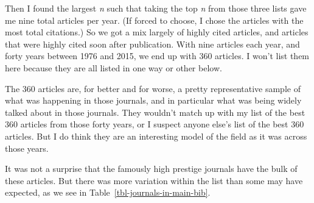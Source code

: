 \documentclass[
  10pt,
  letterpaper,
  DIV=11,
  numbers=noendperiod,
  twoside]{scrartcl}
\begin{document}
Then I found the largest \emph{n} such that taking the top \emph{n} from
those three lists gave me nine total articles per year. (If forced to
choose, I chose the articles with the most total citations.) So we got a
mix largely of highly cited articles, and articles that were highly
cited soon after publication. With nine articles each year, and forty
years between 1976 and 2015, we end up with 360 articles. I won't list
them here because they are all listed in one way or other below.

The 360 articles are, for better and for worse, a pretty representative
sample of what was happening in those journals, and in particular what
was being widely talked about in those journals. They wouldn't match up
with my list of the best 360 articles from those forty years, or I
suspect anyone else's list of the best 360 articles. But I do think they
are an interesting model of the field as it was across those years.

It was not a surprise that the famously high prestige journals have the
bulk of these articles. But there was more variation within the list
than some may have expected, as we see in
Table~\ref{tbl-journals-in-main-bib}.
\end{document}
